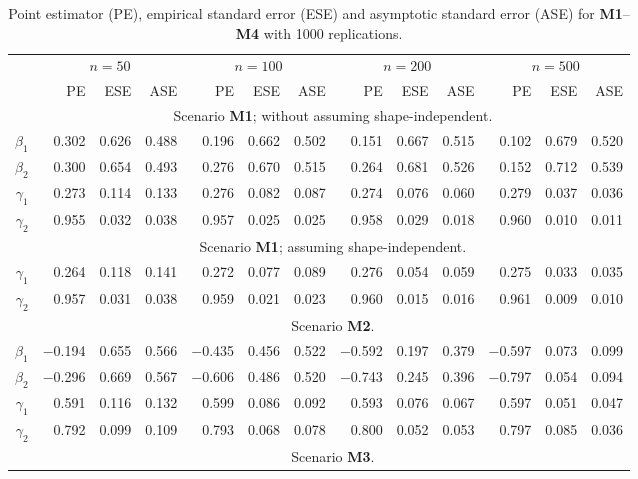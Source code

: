 \documentclass[a4paper,10pt]{article}
\begin{document}
\begin{table}[ht]
\centering
\caption{Point estimator (PE), empirical standard error (ESE) and asymptotic standard error (ASE) for \textbf{M1}--\textbf{M4} with 1000 replications.}
\begin{tabular}{r rrr rrr rrr rrr}
\toprule
& \multicolumn{3}{c}{$n=50$} & \multicolumn{3}{c}{$n=100$} & \multicolumn{3}{c}{$n=200$} & \multicolumn{3}{c}{$n=500$}\\
\cmidrule(l){2-4}\cmidrule(l){5-7}\cmidrule(l){8-10}\cmidrule(l){11-13}
& PE & ESE & ASE & PE & ESE & ASE & PE & ESE & ASE & PE & ESE & ASE \\
\midrule
& \multicolumn{12}{c}{Scenario \textbf{M1}; without assuming shape-independent.}\\
[1ex]
$\beta_1$ & 0.302 & 0.626 & 0.488 & 0.196 & 0.662 & 0.502 & 0.151 & 0.667 & 0.515 & 0.102 & 0.679 & 0.520 \\ 
$\beta_2$ & 0.300 & 0.654 & 0.493 & 0.276 & 0.670 & 0.515 & 0.264 & 0.681 & 0.526 & 0.152 & 0.712 & 0.539 \\ 
$\gamma_1$ & 0.273 & 0.114 & 0.133 & 0.276 & 0.082 & 0.087 & 0.274 & 0.076 & 0.060 & 0.279 & 0.037 & 0.036 \\ 
$\gamma_2$ & 0.955 & 0.032 & 0.038 & 0.957 & 0.025 & 0.025 & 0.958 & 0.029 & 0.018 & 0.960 & 0.010 & 0.011 \\ 
[1ex]
& \multicolumn{12}{c}{Scenario \textbf{M1}; assuming shape-independent.}\\
[1ex]
$\gamma_1$ & 0.264 & 0.118 & 0.141 & 0.272 & 0.077 & 0.089 & 0.276 & 0.054 & 0.059 & 0.275 & 0.033 & 0.035 \\ 
$\gamma_2$ & 0.957 & 0.031 & 0.038 & 0.959 & 0.021 & 0.023 & 0.960 & 0.015 & 0.016 & 0.961 & 0.009 & 0.010 \\ 
[1ex]
& \multicolumn{12}{c}{Scenario \textbf{M2}.}\\
[1ex]
$\beta_1$ & $-$0.194 & 0.655 & 0.566 & $-$0.435 & 0.456 & 0.522 & $-$0.592 & 0.197 & 0.379 & $-$0.597 & 0.073 & 0.099 \\ 
$\beta_2$ & $-$0.296 & 0.669 & 0.567 & $-$0.606 & 0.486 & 0.520 & $-$0.743 & 0.245 & 0.396 & $-$0.797 & 0.054 & 0.094 \\ 
$\gamma_1$ & 0.591 & 0.116 & 0.132 & 0.599 & 0.086 & 0.092 & 0.593 & 0.076 & 0.067 & 0.597 & 0.051 & 0.047 \\ 
$\gamma_2$ & 0.792 & 0.099 & 0.109 & 0.793 & 0.068 & 0.078 & 0.800 & 0.052 & 0.053 & 0.797 & 0.085 & 0.036 \\ 
[1ex]
& \multicolumn{12}{c}{Scenario \textbf{M3}.}\\

\end{tabular}
\end{table}
\end{document}
